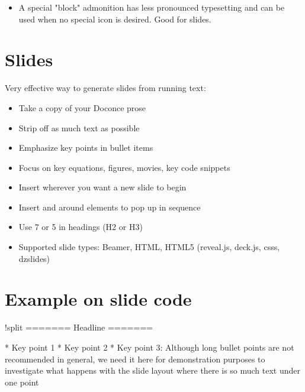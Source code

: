 \documentclass[%
twoside,                 %
draft,                   %
final,                   %
chapterprefix=true,      %
open=right               %
10pt]{book}
\newenvironment{graybox1admon}[1][]{
\begin{graybox1mdframed}[frametitle=#1]
}
{
\end{graybox1mdframed}
}
\begin{document}
\begin{shadedquoteBlue}
\begin{graybox1admon}[]
\begin{itemize}
  \item A special "block" admonition has less pronounced typesetting and
    can be used when no special icon is desired. Good for slides.
\end{itemize}

\noindent
\end{graybox1admon}



\section*{Slides}

Very effective way to generate slides from running text:

\begin{itemize}
 \item Take a copy of your Doconce prose

 \item Strip off as much text as possible

 \item Emphasize key points in bullet items

 \item Focus on key equations, figures, movies, key code snippets

 \item Insert  wherever you want a new slide to begin

 \item Insert  and  around elements to pop up
   in sequence

 \item Use 7 \code{=} or 5 \code{=} in headings (H2 or H3)

 \item Supported slide types: Beamer, HTML,
   HTML5 (reveal.js, deck.js, csss, dzslides)
\end{itemize}

\noindent
\section*{Example on slide code}

\bccq
!split
======= Headline =======

 * Key point 1
 * Key point 2
 * Key point 3: Although long
   bullet points are not recommended in general, we need
   it here for demonstration purposes to investigate
   what happens with the slide layout where there is
   so much text under one point


\end{shadedquoteBlue}
\end{document}
